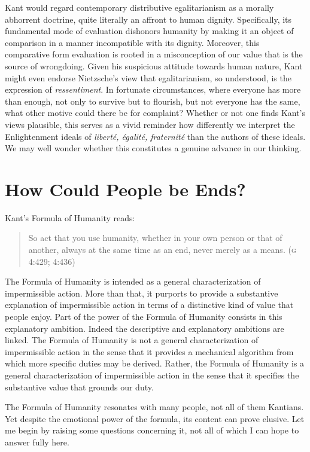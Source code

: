 \documentclass[12pt]{article}
\begin{document}
Kant would regard contemporary distributive egalitarianism as a morally abhorrent doctrine, quite literally an affront to human dignity. Specifically, its fundamental mode of evaluation dishonors humanity by making it an object of comparison in a manner incompatible with its dignity. Moreover, this comparative form evaluation is rooted in a misconception of our value that is the source of wrongdoing. Given his suspicious attitude towards human nature, Kant might even endorse Nietzsche's view that egalitarianism, so understood, is the expression of \emph{ressentiment}. In fortunate circumstances, where everyone has more than enough, not only to survive but to flourish, but not everyone has the same, what other motive could there be for complaint? Whether or not one finds Kant's views plausible, this serves as a vivid reminder how differently we interpret the Enlightenment ideals of \emph{libert\'e, \'egalit\'e, fraternit\'e} than the authors of these ideals. We may well wonder whether this constitutes a genuine advance in our thinking.


\section{How Could People be Ends?} \label{sec:how_could_people_be_ends} %

Kant's Formula of Humanity reads: 
\begin{quote}
	So act that you use humanity, whether in your own person or that of another, always at the same time as an end, never merely as a means. (\textsc{g} 4:429; 4:436) 
\end{quote}

The Formula of Humanity is intended as a general characterization of impermissible action. More than that, it purports to provide a substantive explanation of impermissible action in terms of a distinctive kind of value that people enjoy. Part of the power of the Formula of Humanity consists in this explanatory ambition. Indeed the descriptive and explanatory ambitions are linked. The Formula of Humanity is not a general characterization of impermissible action in the sense that it provides a mechanical algorithm from which more specific duties may be derived. Rather, the Formula of Humanity is a general characterization of impermissible action in the sense that it specifies the substantive value that grounds our duty.

The Formula of Humanity resonates with many people, not all of them Kantians. Yet despite the emotional power of the formula, its content can prove elusive. Let me begin by raising some questions concerning it, not all of which I can hope to answer fully here.
\end{document}
